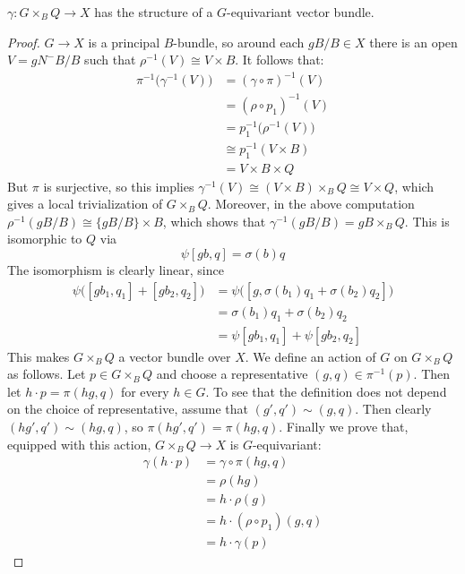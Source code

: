 \begin{proposition}
\label{prop:eqvb}
$\gamma : G\times_B Q \to X$ has the structure of a $G$-equivariant vector bundle.
\end{proposition}
\begin{proof}
$G \to X$ is a principal $B$-bundle, so around each $gB/B \in X$ there is an open $V = gN^-B/B$ such that $\rho^{-1}(V) \cong
V \times B$.  It follows that:
\begin{align*}
\pi^{-1} \big(\gamma^{-1}(V) \big) &= (\gamma \circ \pi)^{-1}(V) \\
&= (\rho \circ p_1)^{-1}(V) \\
&= p_1^{-1} \big(\rho^{-1}(V) \big) \\
&\cong p_1^{-1} (V \times B) \\
&= V \times B \times Q
\end{align*}
But $\pi$ is surjective, so this implies $\gamma^{-1}(V) \cong (V \times B)\times_B Q \cong V \times Q$, which gives a local
trivialization of $G\times_B Q$. Moreover, in the above computation $\rho^{-1}(gB/B) \cong \{gB/B\} \times B$, which shows 
that $\gamma^{-1}(gB/B) = gB \times_B Q$. This is isomorphic to $Q$ via
\[	\psi [gb, q] = \sigma(b) q	\]
The isomorphism is clearly linear, since
\begin{align*}
 \psi \big( [gb_1,q_1] + [gb_2, q_2] \big) &= \psi \big( [g, \sigma(b_1)q_1 + \sigma(b_2)q_2] \big) \\
&= \sigma(b_1)q_1 + \sigma(b_2)q_2 \\
&= \psi [gb_1, q_1] + \psi[gb_2,q_2]
\end{align*}
This makes $G\times_B Q$ a vector bundle over $X$. We define an action of $G$ on $G\times_B Q$ as follows. 
Let $p \in G\times_B Q$ and choose a representative $(g,q) \in \pi^{-1}
(p)$. Then let $h \cdot p = \pi (hg, q)$ for every $h \in G$. To see that the definition does not depend on the choice of
representative, assume that $(g',q') \sim (g,q)$. Then clearly $(hg',q') \sim (hg,q)$, so $\pi(hg',q') = \pi(hg,q)$. Finally
we prove that, equipped with this action, $G\times_B Q \to X$ is $G$-equivariant:
\begin{align*}
\gamma(h \cdot p) &= \gamma \circ \pi (hg, q) \\
&= \rho(hg) \\
&= h \cdot \rho(g) \\
&= h \cdot (\rho \circ p_1)(g,q) \\
&= h \cdot \gamma(p)
\end{align*}
\end{proof}

